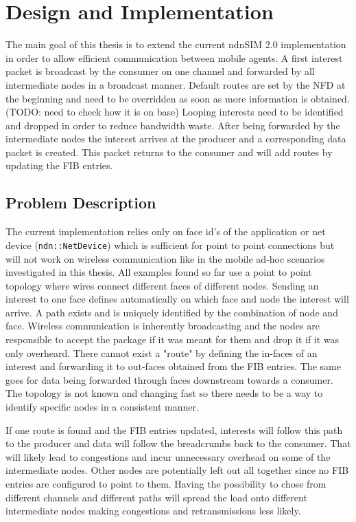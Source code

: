\chapter{Design and Implementation}

The main goal of this thesis is to extend the current ndnSIM 2.0 implementation in order to allow efficient communication between mobile agents. A first interest packet is broadcast by the consumer on one channel and forwarded by all intermediate nodes in a broadcast manner. Default routes are set by the NFD at the beginning and need to be overridden as soon as more information is obtained. (TODO: need to check how it is on base) Looping interests need to be identified and dropped in order to reduce bandwidth waste. After being forwarded by the intermediate nodes the interest arrives at the producer and a corresponding data packet is created. This packet returns to the consumer and will add routes by updating the FIB entries.

\section{Problem Description}

The current implementation relies only on face id's of the application or net device (\texttt{ndn::NetDevice}) which is sufficient for point to point connections but will not work on wireless communication like in the mobile ad-hoc scenarios investigated in this thesis. All examples found so far use a point to point topology where wires connect different faces of different nodes. Sending an interest to one face defines automatically on which face and node the interest will arrive. A path exists and is uniquely identified by the combination of node and face. Wireless communication is inherently broadcasting and the nodes are responsible to accept the package if it was meant for them and drop it if it was only overheard. There cannot exist a "route" by defining the in-faces of an interest and forwarding it to out-faces obtained from the FIB entries. The same goes for data being forwarded through faces downstream towards a consumer. The topology is not known and changing fast so there needs to be a way to identify specific nodes in a consistent manner.

If one route is found and the FIB entries updated, interests will follow this path to the producer and data will follow the breadcrumbs back to the consumer. That will likely lead to congestions and incur unnecessary overhead on some of the intermediate nodes. Other nodes are potentially left out all together since no FIB entries are configured to point to them. Having the possibility to chose from different channels and different paths will spread the load onto different intermediate nodes making congestions and retransmissions less likely.


